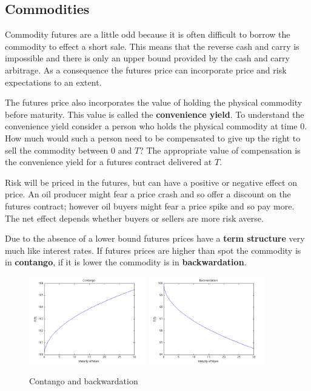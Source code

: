 


\subsection{Commodities}


Commodity futures are a little odd because it is often difficult to borrow the commodity to effect a short sale. This means that the reverse cash and carry is impossible and there is only an upper bound provided by the cash and carry arbitrage. As a consequence the futures price can incorporate price and risk expectations to an extent. 

The futures price also incorporates the value of holding the physical commodity before maturity. This value is called the \textbf{convenience yield}. To understand the convenience yield consider a person who holds the physical commodity at time $0$. How much would such a person need to be compensated to give up the right to sell the commodity between $0$ and $T$? The appropriate value of compensation is the convenience yield for a futures contract delivered at $T$.  

Risk will be priced in the futures, but can have a positive or negative effect on price. An oil producer might fear a price crash and so offer a discount on the futures contract; however oil buyers might fear a price spike and so pay more. The net effect depends whether buyers or sellers are more risk averse.

Due to the absence of a lower bound futures prices have a \textbf{term structure} very much like interest rates. If futures prices are higher than spot the commodity is in \textbf{contango}, if it is lower the commodity is in \textbf{backwardation}. 

\begin{figure}[htbp]
\begin{center}
  \includegraphics[width=2in]{pics/contango.png} \includegraphics[width=2in]{pics/backwardation.png}   \caption{Contango and backwardation}
\label{contangoandbackwardation}
\end{center}
\end{figure}

